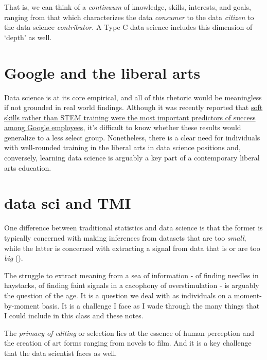 \documentclass[openany]{book}
\begin{document}
That is, we can think of a \emph{continuum} of knowledge, skills, interests, and goals, ranging from that which characterizes the data \emph{consumer} to the data \emph{citizen} to the data science \emph{contributor.} A Type C data science includes this dimension of `depth' as well.

\hypertarget{google-and-the-liberal-arts}{%
\section{Google and the liberal arts}\label{google-and-the-liberal-arts}}

Data science is at its core empirical, and all of this rhetoric would be meaningless if not grounded in real world findings. Although it was recently reported that \href{https://www.washingtonpost.com/news/answer-sheet/wp/2017/12/20/the-surprising-thing-google-learned-about-its-employees-and-what-it-means-for-todays-students/?sw_bypass=true\&utm_term=.23e48235d66e}{soft skills rather than STEM training were the most important predictors of success among Google employees}, it's difficult to know whether these results would generalize to a less select group. Nonetheless, there is a clear need for individuals with well-rounded training in the liberal arts in data science positions and, conversely, learning data science is arguably a key part of a contemporary liberal arts education.

\hypertarget{data-sci-and-tmi}{%
\section{data sci and TMI}\label{data-sci-and-tmi}}

One difference between traditional statistics and data science is that the former is typically concerned with making inferences from datasets that are too \emph{small}, while the latter is concerned with extracting a signal from data that is or are too \emph{big} (\citet{donoho2015fifty}).

The struggle to extract meaning from a sea of information - of finding needles in haystacks, of finding faint signals in a cacophony of overstimulation - is arguably the question of the age. It is a question we deal with as individuals on a moment-by-moment basis. It is a challenge I face as I wade through the many things that I could include in this class and these notes.

The \emph{primacy of editing} or selection lies at the essence of human perception and the creation of art forms ranging from novels to film. And it is a key challenge that the data scientist faces as well.
\end{document}
